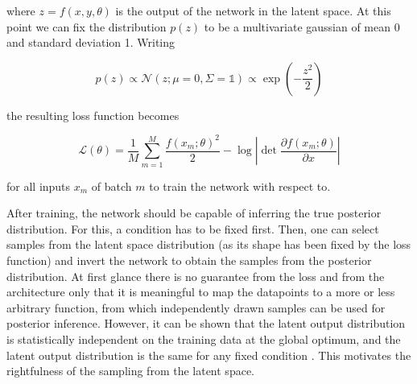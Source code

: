 where $z = f(x, y, \theta)$ is the output of the network in the latent space. At this point we can fix the distribution $p(z)$ to be a multivariate gaussian of mean 0 and standard deviation 1. Writing

\begin{equation*}
	p(z) \propto \mathcal{N}(z; \mu = 0, \Sigma=\mathbb{1}) \propto \exp\left(-\frac{z^2}{2}\right)
\end{equation*}

the resulting loss function becomes

\begin{equation*}
	\mathcal{L}(\theta) = \frac{1}{M} \sum_{m=1}^{M} \frac{f(x_m; \theta)^2}{2} - \log\left|\det\frac{\partial f(x_m; \theta)}{\partial x}\right|
\end{equation*}

for all inputs $x_m$ of batch $m$ to train the network with respect to.

After training, the network should be capable of inferring the true posterior distribution. For this, a condition has to be fixed first. Then, one can select samples from the latent space distribution (as its shape has been fixed by the loss function) and invert the network to obtain the samples from the posterior distribution.
At first glance there is no guarantee from the loss and from the architecture only that it is meaningful to map the datapoints to a more or less arbitrary function, from which independently drawn samples can be used for posterior inference. However, it can be shown that the latent output distribution is statistically independent on the training data at the global optimum, and the latent output distribution is the same for any fixed condition \cite{BayesFlow}. This motivates the rightfulness of the sampling from the latent space.

